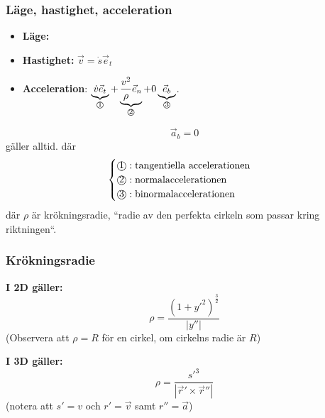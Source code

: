 \documentclass{article}
\newenvironment{ankiflashcard}[1]{}{}
\newcommand{\numbercircle}[1]{
\text{\textcircled{#1}}
}
\newcommand{\numbercirclewithunderbrace}[2]{
\underbrace{#1}_{\numbercircle{#2}}
}
\begin{document}
\begin{paracol}{2}
\begin{ankiflashcard}{Ange ekvationer för läge, hastighet och acceleration i naturliga komponenter.}
    
\subsubsection{Läge, hastighet, acceleration}
\begin{itemize}
    \item \textbf{Läge:}
    \item \textbf{Hastighet:} $\vec v = \dot s \vec e_t$
    \item \textbf{Acceleration}: $\numbercirclewithunderbrace{\dot v \vec e_t}{1} + \numbercirclewithunderbrace{\frac{v^2}{\rho} \vec e_n}{2} + 0\numbercirclewithunderbrace{\vec e_b}{3}$. 
\end{itemize}
$$\vec a_b = 0$$ gäller alltid.
där $$\begin{cases}
    \numbercircle{1}: \text{tangentiella accelerationen}\\
    \numbercircle{2}: \text{normalaccelerationen} \\
    \numbercircle{3}: \text{binormalaccelerationen} \\
\end{cases}$$
där $\rho$ är krökningsradie, ``radie av den perfekta cirkeln som passar kring riktningen``.
\end{ankiflashcard}

\subsubsection{Krökningsradie}

\begin{ankiflashcard}{Ställ upp formeln för krökningsradie (2D)}
\textbf{I 2D gäller:}
$$
\rho = \frac{(1+y'^2)^{\frac{3}{2}}}{\left| y'' \right|}
$$
(Observera att $\rho = R$ för en cirkel, om cirkelns radie är $R$)
\end{ankiflashcard}

\begin{ankiflashcard}{Ställ upp formeln för krökningsradie (3D)}
    
\textbf{I 3D gäller:}
$$
\rho = \frac{s'^3}{\left| \vec r' \times \vec r'' \right|}
$$
(notera att $s'=v$ och $r'=\vec v$ samt $r'' = \vec a$)
\end{ankiflashcard}


\end{paracol}
\end{document}
